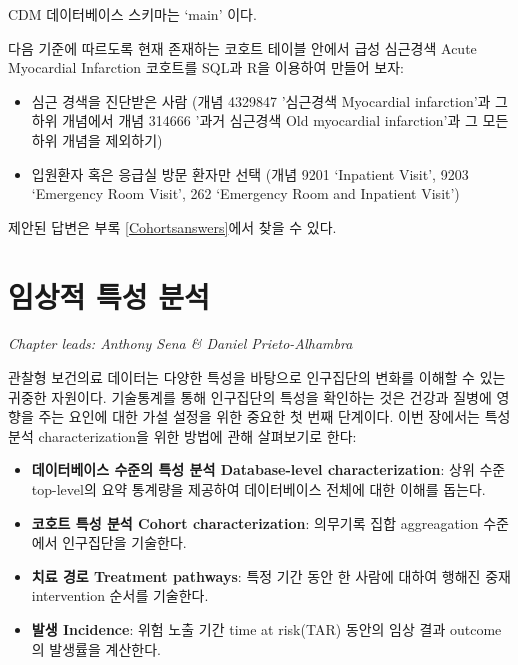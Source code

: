\documentclass[10.5pt]{book}
\providecommand{\tightlist}{%
  \setlength{\itemsep}{0pt}\setlength{\parskip}{0pt}}
\theoremstyle{definition}
\theoremstyle{definition}
\theoremstyle{definition}
\theoremstyle{remark}
\let\BeginKnitrBlock\begin \let\EndKnitrBlock\end
\begin{document}
CDM 데이터베이스 스키마는 `main' 이다.

\BeginKnitrBlock{exercise}
\protect\hypertarget{exr:exerciseCohortsSql}{}{\label{exr:exerciseCohortsSql}
}다음 기준에 따르도록 현재 존재하는 코호트 테이블 안에서 급성 심근경색
Acute Myocardial Infarction 코호트를 SQL과 R을 이용하여 만들어 보자:

\begin{itemize}
\tightlist
\item
  심근 경색을 진단받은 사람 (개념 4329847 '심근경색 Myocardial
  infarction'과 그 하위 개념에서 개념 314666 '과거 심근경색 Old
  myocardial infarction'과 그 모든 하위 개념을 제외하기)
\item
  입원환자 혹은 응급실 방문 환자만 선택 (개념 9201 `Inpatient Visit',
  9203 `Emergency Room Visit', 262 `Emergency Room and Inpatient Visit')
\end{itemize}
\EndKnitrBlock{exercise}

제안된 답변은 부록 \ref{Cohortsanswers}에서 찾을 수 있다.

\chapter{임상적 특성 분석}\label{Characterization}

\emph{Chapter leads: Anthony Sena \& Daniel Prieto-Alhambra}

관찰형 보건의료 데이터는 다양한 특성을 바탕으로 인구집단의 변화를 이해할
수 있는 귀중한 자원이다. 기술통계를 통해 인구집단의 특성을 확인하는 것은
건강과 질병에 영향을 주는 요인에 대한 가설 설정을 위한 중요한 첫 번째
단계이다. 이번 장에서는 특성 분석 characterization을 위한 방법에 관해
살펴보기로 한다:

\begin{itemize}
\tightlist
\item
  \textbf{데이터베이스 수준의 특성 분석 Database-level
  characterization}: 상위 수준 top-level의 요약 통계량을 제공하여
  데이터베이스 전체에 대한 이해를 돕는다.
\item
  \textbf{코호트 특성 분석 Cohort characterization}: 의무기록 집합
  aggreagation 수준에서 인구집단을 기술한다.
\item
  \textbf{치료 경로 Treatment pathways}: 특정 기간 동안 한 사람에 대하여
  행해진 중재 intervention 순서를 기술한다.
\item
  \textbf{발생 Incidence}: 위험 노출 기간 time at risk(TAR) 동안의 임상
  결과 outcome의 발생률을 계산한다.
\end{itemize}
\end{document}

